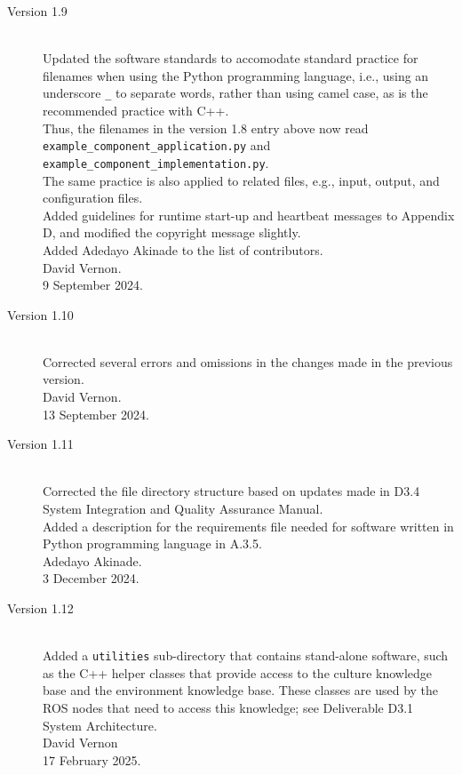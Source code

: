 \documentclass{CSSRforAfrica}
\begin{document}
\begin{description}
\item [Version 1.9]~\\
Updated the software standards to accomodate standard practice for filenames when using the Python programming language, i.e., using an underscore {\small \verb+_+} to separate words, rather than using camel case, as is the recommended practice with C++.\\
Thus, the filenames in the version 1.8 entry above now read \\
{\small \verb+example_component_application.py+} and {\small \verb+example_component_implementation.py+}. \\
The same practice is also applied to related files, e.g., input, output, and configuration files.\\
Added guidelines for runtime start-up and  heartbeat messages to Appendix D, and modified the copyright message slightly.\\
Added Adedayo Akinade to the list of contributors.\\     
David Vernon. \\       
9 September 2024. 

\item [Version 1.10]~\\
Corrected several errors and omissions in the changes made in the previous version.\\     
David Vernon. \\       
13 September 2024.

\item [Version 1.11]~\\
Corrected the file directory structure based on updates made in D3.4 System Integration and Quality Assurance Manual.\\     
Added a description for the requirements file needed for software written in Python programming language in A.3.5.\\
Adedayo Akinade. \\       
3 December 2024.

\item [Version 1.12]~\\
Added  a {\small \tt utilities} sub-directory that contains stand-alone software, such as the C++ helper classes that provide access to the culture knowledge base and the environment knowledge base. These classes are used by the ROS nodes that need to access this knowledge; see Deliverable D3.1 System Architecture.\\
David Vernon \\       
17 February 2025.


\end{description}
\end{document}
